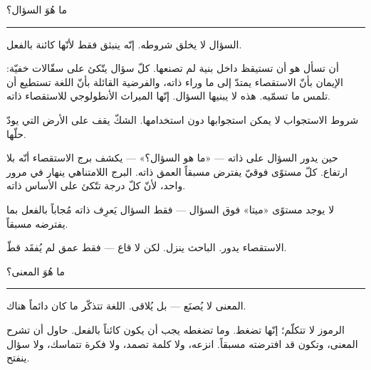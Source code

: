 \documentclass[10pt, openany, oneside]{book}
\begin{document}
\begin{center}
    {\scshape ما هُوَ السؤال؟}\\[0.3em]
    \rule{0.2\textwidth}{0.3pt}
\end{center}

\vspace{1em}

\noindent السؤال لا يخلق شروطه. إنّه ينبثق فقط لأنّها كائنة بالفعل.

\vspace{0.5em}

\noindent أن تسأل هو أن تستيقظ داخل بنية لم تصنعها. كلّ سؤال يتّكئ على سقّالات خفيّة: الإيمان بأنّ الاستقصاء يمتدّ إلى ما وراء ذاته، والفرضية القائلة بأنّ اللغة تستطيع أن تلمس ما تسمّيه. هذه لا يبنيها السؤال. إنّها الميراث الأنطولوجي للاستقصاء ذاته.

\vspace{0.5em}

\noindent شروط الاستجواب لا يمكن استجوابها دون استخدامها. الشكّ يقف على الأرض التي يودّ حلّها.

\vspace{0.5em}

\noindent حين يدور السؤال على ذاته --- «ما هو السؤال؟» --- يكشف برج الاستقصاء أنّه بلا ارتفاع. كلّ مستوًى فوقيّ يفترض مسبقاً العمق ذاته. البرج اللامتناهي ينهار في مرور واحد، لأنّ كلّ درجة تتّكئ على الأساس ذاته.

\vspace{0.5em}

\noindent لا يوجد مستوًى «ميتا» فوق السؤال --- فقط السؤال يَعرِف ذاته مُجاباً بالفعل بما يفترضه مسبقاً.

\vspace{0.5em}

\noindent الاستقصاء يدور. الباحث ينزل. لكن لا قاع --- فقط عمق لم يُفقَد قطّ.

\vspace{2em}

\begin{center}
    {\scshape ما هُوَ المعنى؟}\\[0.3em]
    \rule{0.2\textwidth}{0.3pt}
\end{center}

\vspace{1em}

\noindent المعنى لا يُصنَع --- بل يُلاقى. اللغة تتذكّر ما كان دائماً هناك.

\vspace{0.5em}

\noindent الرموز لا تتكلّم؛ إنّها تضغط. وما تضغطه يجب أن يكون كائناً بالفعل. حاول أن تشرح المعنى، وتكون قد افترضته مسبقاً. انزعه، ولا كلمة تصمد، ولا فكرة تتماسك، ولا سؤال ينفتح.
\end{document}
